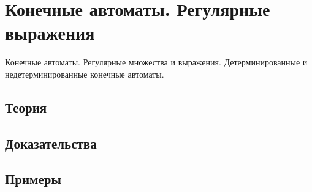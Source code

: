 
\section{Конечные автоматы. Регулярные выражения}
\label{sec:2.3a.07-finite-automata}

\begin{ticket}
Конечные автоматы. Регулярные множества и выражения. Детерминированные и недетерминированные конечные автоматы.
\end{ticket}

\subsection*{Теория}

\subsection*{Доказательства}

\subsection*{Примеры}
